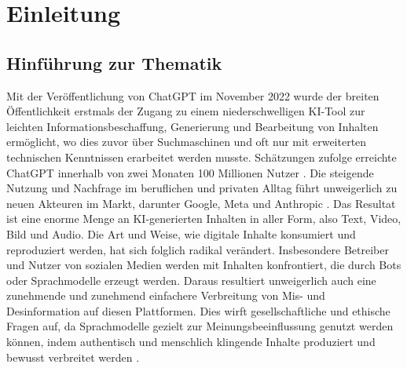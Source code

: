 \chapter{Einleitung}
\label{chap:introduction}

\section{Hinführung zur Thematik}
Mit der Veröffentlichung von ChatGPT im November 2022 \autocite{openai2022} wurde der breiten Öffentlichkeit erstmals der Zugang zu einem niederschwelligen KI-Tool zur leichten Informationsbeschaffung, Generierung und Bearbeitung von Inhalten ermöglicht, wo dies zuvor über Suchmaschinen und oft nur mit erweiterten technischen Kenntnissen erarbeitet werden musste. Schätzungen zufolge erreichte ChatGPT innerhalb von zwei Monaten 100 Millionen Nutzer \autocite{hu2023}. Die steigende Nutzung und Nachfrage im beruflichen und privaten Alltag führt unweigerlich zu neuen Akteuren im Markt, darunter Google, Meta und Anthropic \autocite{le2025llmspredictprerequisiteskills}. Das Resultat ist eine enorme Menge an KI-generierten Inhalten in aller Form, also Text, Video, Bild und Audio. Die Art und Weise, wie digitale Inhalte konsumiert und reproduziert werden, hat sich folglich radikal verändert. Insbesondere Betreiber und Nutzer von sozialen Medien werden mit Inhalten konfrontiert, die durch Bots oder Sprachmodelle erzeugt werden. Daraus resultiert unweigerlich auch eine zunehmende und zunehmend einfachere Verbreitung von Mis- und Desinformation auf diesen Plattformen. Dies wirft gesellschaftliche und ethische Fragen auf, da Sprachmodelle gezielt zur Meinungsbeeinflussung genutzt werden können, indem authentisch und menschlich klingende Inhalte produziert und bewusst verbreitet werden \autocite{coeckelbergh2025}. \\
